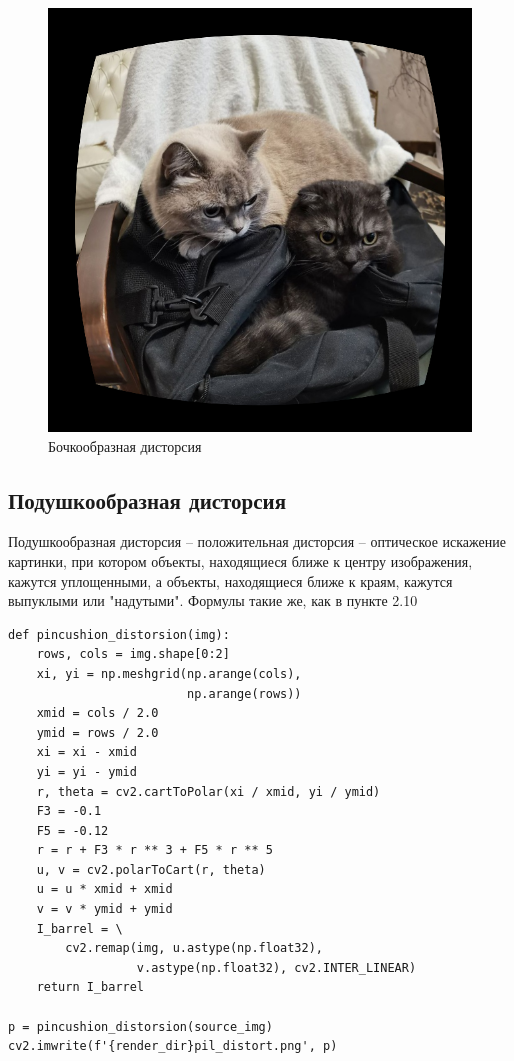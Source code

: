 \documentclass[a4paper, 16pt]{article}
\begin{document}
\begin{figure}[!htb]
    \centering
    \includegraphics[scale=0.3]{barrel.png}
    \captionsetup{skip=0pt}
    \caption{Бочкообразная дисторсия}
    \label{Рис:16}
\end{figure}


\subsection{Подушкообразная дисторсия}
\noindent Подушкообразная дисторсия -- положительная дисторсия --
оптическое искажение картинки, при котором объекты, находящиеся ближе к 
центру изображения, кажутся уплощенными, а объекты, находящиеся ближе к краям,
кажутся выпуклыми или "надутыми". Формулы такие же, как в пункте 2.10


\newpage
\begin{lstlisting}[label=pincushion-code,caption=Код для подушкообразной дисторсии]
def pincushion_distorsion(img):
    rows, cols = img.shape[0:2]
    xi, yi = np.meshgrid(np.arange(cols),
                         np.arange(rows))
    xmid = cols / 2.0
    ymid = rows / 2.0
    xi = xi - xmid
    yi = yi - ymid
    r, theta = cv2.cartToPolar(xi / xmid, yi / ymid)
    F3 = -0.1
    F5 = -0.12
    r = r + F3 * r ** 3 + F5 * r ** 5
    u, v = cv2.polarToCart(r, theta)
    u = u * xmid + xmid
    v = v * ymid + ymid
    I_barrel = \
        cv2.remap(img, u.astype(np.float32),
                  v.astype(np.float32), cv2.INTER_LINEAR)
    return I_barrel

p = pincushion_distorsion(source_img)
cv2.imwrite(f'{render_dir}pil_distort.png', p)
\end{lstlisting}
\end{document}

